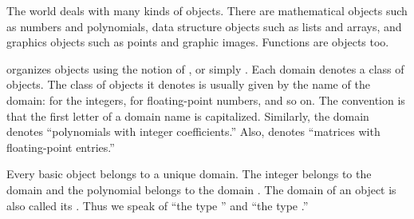 
The \Language{} world deals with many kinds of objects.
There are mathematical objects such as numbers and polynomials,
data structure objects such as lists and arrays, and graphics
objects such as points and graphic images.
Functions are objects too.

\Language{} organizes objects using the notion of , or simply .
Each domain denotes a class of objects.
The class of objects it denotes is usually given by the name of the
domain:  for the integers,  for
floating-point numbers, and so on.
The convention is that the first letter of a domain name is capitalized.
Similarly, the domain  denotes ``polynomials
with integer coefficients.''
Also,  denotes ``matrices with floating-point
entries.''

Every basic \Language{} object belongs to a unique domain.
The integer  belongs to the domain  and
the polynomial  belongs to the domain
.
The domain of an object is also called its .
Thus we speak of ``the type ''
and ``the type .''


